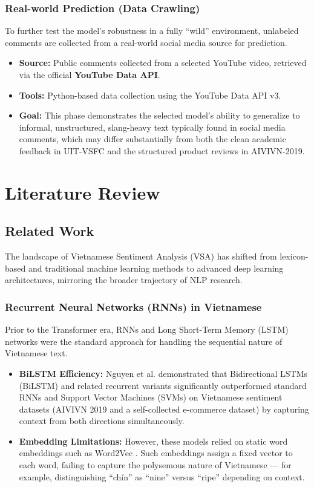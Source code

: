 \documentclass[12pt]{report} %
\begin{document}
\subsection{Real-world Prediction (Data Crawling)}
To further test the model's robustness in a fully ``wild'' environment, unlabeled comments are collected from a real-world social media source for prediction.
\begin{itemize}
    \item \textbf{Source:} Public comments collected from a selected YouTube video, retrieved via the official \textbf{YouTube Data API}.
    \item \textbf{Tools:} Python-based data collection using the YouTube Data API v3.
    \item \textbf{Goal:} This phase demonstrates the selected model's ability to generalize to informal, unstructured, slang-heavy text typically found in social media comments, which may differ substantially from both the clean academic feedback in UIT-VSFC and the structured product reviews in AIVIVN-2019.
\end{itemize}

\chapter{Literature Review}

\section{Related Work}

The landscape of Vietnamese Sentiment Analysis (VSA) has shifted from lexicon-based and traditional machine learning methods to advanced deep learning architectures, mirroring the broader trajectory of NLP research.

\subsection{Recurrent Neural Networks (RNNs) in Vietnamese}

Prior to the Transformer era, RNNs and Long Short-Term Memory (LSTM) networks \cite{hochreiter1997lstm} were the standard approach for handling the sequential nature of Vietnamese text.

\begin{itemize}
    \item \textbf{BiLSTM Efficiency:} Nguyen et al. \cite{nguyen2018ensemble} demonstrated that Bidirectional LSTMs (BiLSTM) and related recurrent variants significantly outperformed standard RNNs and Support Vector Machines (SVMs) on Vietnamese sentiment datasets (AIVIVN 2019 and a self-collected e-commerce dataset) by capturing context from both directions simultaneously.

    \item \textbf{Embedding Limitations:} However, these models relied on static word embeddings such as Word2Vec \cite{mikolov2013word2vec}. Such embeddings assign a fixed vector to each word, failing to capture the polysemous nature of Vietnamese --- for example, distinguishing \foreignlanguage{vietnamese}{``chín''} as ``nine'' versus ``ripe'' depending on context.
\end{itemize}
\end{document}
